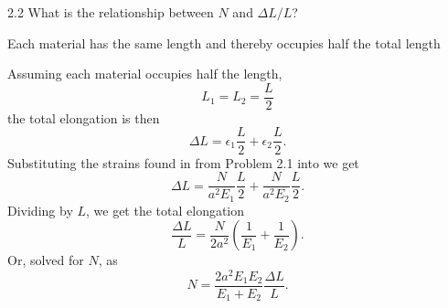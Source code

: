 
  \begin{problem}{2.2}
    What is the relationship between $N$ and $\Delta L / L$?
  \end{problem}

  \begin{assumptions}
    \item Each material has the same length and thereby occupies half the total length
  \end{assumptions}

  \begin{derivation}
    Assuming each material occupies half the length,
    \begin{equation*}
      L_1 = L_2 = \frac{L}{2}
    \end{equation*}
    the total elongation is then
    \begin{equation} \label{eq:32deltal}
      \Delta L = \epsilon_1 \frac{L}{2} + \epsilon_2 \frac{L}{2}
    .\end{equation}
    Substituting the strains found in  from Problem 2.1 into  we get
    \begin{equation*}
      \Delta L = \frac{N}{a^2 E_1} \frac{L}{2} + \frac{N}{a^2 E_2} \frac{L}{2}
    .\end{equation*}
    Dividing by $L$, we get the total elongation
    \begin{equation*}
      \frac{\Delta L}{L} = \frac{N}{2a^2} \left( \frac{1}{E_1} + \frac{1}{E_2} \right)
    .\end{equation*}
    Or, solved for $N$, as
    \begin{equation*}
      N = \frac{2a^2 E_1 E_2}{E_1 + E_2} \frac{\Delta L}{L}
    .\end{equation*}
  \end{derivation}

